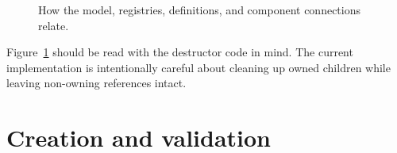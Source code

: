 \begin{figure}[htbp]
\centering
\caption{How the model, registries, definitions, and component connections relate.}
\label{fig:model-component-modeldata-relationship}
\end{figure}

Figure~\ref{fig:model-component-modeldata-relationship} should be read with the
destructor code in mind. The current implementation is intentionally careful
about cleaning up owned children while leaving non-owning references intact.

\section{Creation and validation}
\label{sec:model-component-creation-and-validation}

